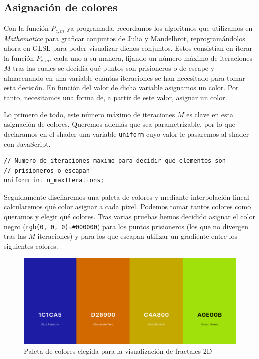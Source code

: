 \subsection{Asignación de colores}
\label{subsection:colores}

Con la función $P_{c,m}$ ya programada, recordamos los algoritmos que utilizamos en \textit{Mathematica} para graficar conjuntos de Julia y Mandelbrot, reprogramándolos ahora en GLSL para poder visualizar dichos conjuntos. Estos consistían en iterar la función $P_{c,m}$, cada uno a su manera, fijando un número máximo de iteraciones $M$ tras las cuales se decidía qué puntos son prisioneros o de escape y almacenando en una variable cuántas iteraciones se han necesitado para tomar esta decisión. En función del valor de dicha variable asignamos un color. Por tanto, necesitamos una forma de, a partir de este valor, asignar un color.

Lo primero de todo, este número máximo de iteraciones $M$ es clave en esta asignación de colores. Queremos además que sea parametrizable, por lo que declaramos en el shader una variable \verb|uniform| cuyo valor le pasaremos al shader con JavaScript.

\begin{lstlisting}
// Numero de iteraciones maximo para decidir que elementos son
// prisioneros o escapan
uniform int u_maxIterations;
\end{lstlisting}

Seguidamente diseñaremos una paleta de colores y mediante interpolación lineal calcularemos qué color asignar a cada píxel. Podemos tomar tantos colores como queramos y elegir qué colores. Tras varias pruebas hemos decidido asignar el color negro (\verb|rgb(0, 0, 0)=#000000|) para los puntos prisioneros (los que no divergen tras las $M$ iteraciones) y para los que escapan utilizar un gradiente entre los siguientes colores:

\begin{figure} [ht]
    \centering
    \includegraphics[scale = 0.4]{img/C6/paleta.png}
    \caption{Paleta de colores elegida para la visualización de fractales 2D}
    \label{fig:paleta}
\end{figure}

